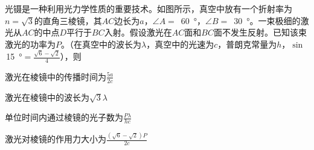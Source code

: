 光镊是一种利用光力学性质的重要技术。如图所示，真空中放有一个折射率为\(n = \sqrt{3}\)的直角三棱镜，其\(AC\)边长为\(a\)，\(\angle A =\) \,\qty{60}{\degree}，\(\angle B =\) \,\qty{30}{\degree}。一束极细的激光从\(AC\)的中点\(D\)平行于\(BC\)入射。假设激光在\(AC\)面和\(BC\)面不发生反射。已知该束激光的功率为\(P\)。（在真空中的波长为\(\lambda\)，真空中的光速为\(c\)，普朗克常量为\(h\)，\(\sin\) \,\qty{15}{\degree}\( = \frac{\sqrt{6} - \sqrt{2}}{4}\)），则\paren[]
	
\begin{choices}
	\item 激光在棱镜中的传播时间为\(\frac{5a}{2c}\)
	\item 激光在棱镜中的波长为\(\sqrt{3}\lambda\)
	\item 单位时间内通过棱镜的光子数为\(\frac{P\lambda}{hc}\)
	\item 激光对棱镜的作用力大小为\(\frac{(\sqrt{6} - \sqrt{2})P}{2c}\)
\end{choices}
\begin{answer}
    
\end{answer}